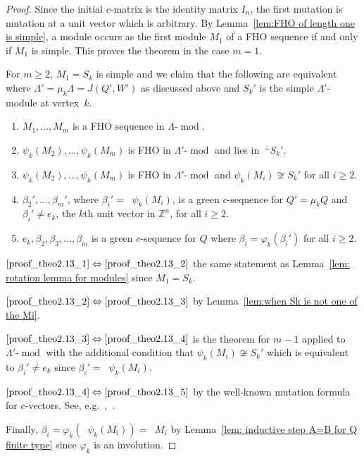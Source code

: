\documentclass[10pt]{amsart}
\theoremstyle{definition}
\newcommand{\eg}{e.g.\ }
\newcommand{\ifff}{\Leftrightarrow}
\DeclareMathOperator{\undim}{\underline{dim}}
\DeclareMathOperator{\modr}{mod}
\newcommand{\field}[1]{\mathbb{#1}}
\newcommand{\ZZ}{\ensuremath{{\field{Z}}}}
\begin{document}
\begin{proof} Since the initial $c$-matrix is the identity matrix $I_n$, the first mutation is mutation at a unit vector which is arbitrary. By Lemma~\ref{lem:FHO of length one is simple}, a module occurs as the first module $M_1$ of a FHO sequence if and only if $M_1$ is simple. This proves the theorem in the case $m=1$.

For $m\ge2$, $M_1=S_k$ is simple and we claim that the following are equivalent where $\Lambda'=\mu_k\Lambda=J(Q',W')$ as discussed above and $S_k'$ is the simple $\Lambda'$-module at vertex~$k$.
\begin{enumerate}
\item\label{proof_theo2.13_1} $M_1,\ldots,M_m$ is a FHO sequence in $\Lambda\text{-}\modr $.
\item\label{proof_theo2.13_2} $\psi_k(M_2),\ldots,\psi_k(M_m)$ is FHO in $\Lambda'\text{-}\modr $ and lies in $\,^\perp S_k'$.
\item\label{proof_theo2.13_3} $\psi_k(M_2),\ldots,\psi_k(M_m)$ is FHO in $\Lambda'\text{-}\modr $ and $\psi_k(M_i)\not\cong S_k'$ for all $i\ge2$.
\item\label{proof_theo2.13_4} $\beta_2',\ldots,\beta_m'$, where $\beta_i'=\undim \psi_k(M_i)$, is a green $c$-sequence for $Q'=\mu_kQ$ and $\beta_i'\neq e_k$, the $k$th unit vector in $\ZZ^n$, for all $i\ge2$.
\item\label{proof_theo2.13_5} $e_k,\beta_2,\beta_3,\ldots,\beta_m$ is a green $c$-sequence for $Q$ where $\beta_i=\varphi_k(\beta_i')$ for all $i\ge2$.
\end{enumerate}
$\eqref{proof_theo2.13_1}\ifff\eqref{proof_theo2.13_2}$ the same statement as Lemma~\ref{lem: rotation lemma for modules} since $M_1=S_k$.

\noindent$\eqref{proof_theo2.13_2}\ifff\eqref{proof_theo2.13_3}$ by Lemma~\ref{lem:when Sk is not one of the Mi}.

\noindent$\eqref{proof_theo2.13_3}\ifff\eqref{proof_theo2.13_4}$ is the theorem for $m-1$ applied to $\Lambda'\text{-}\modr $ with the additional condition that $\psi_k(M_i)\not\cong S_k'$ which is equivalent to $\beta_i'\neq e_k$ since $\beta_i'=\undim\psi_k(M_i)$.

\noindent$\eqref{proof_theo2.13_4}\ifff\eqref{proof_theo2.13_5}$ by the well-known mutation formula for $c$-vectors. See, \eg ,~\cite[Thm~2.1.8]{BHIT}.

Finally, $\beta_i=\varphi_k(\undim \psi_k(M_i))=\undim M_i$ by Lemma~\ref{lem: inductive step A=B for Q finite type} since $\varphi_k$ is an involution. \end{proof}
\end{document}
